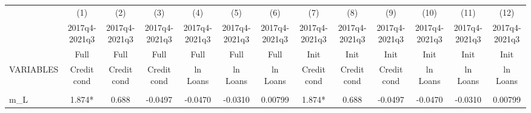 \documentclass[]{article}
\begin{document}
\begin{center}
\begin{tabular}{lcccccccccccc} \hline
 & (1) & (2) & (3) & (4) & (5) & (6) & (7) & (8) & (9) & (10) & (11) & (12) \\
 & 2017q4-2021q3 & 2017q4-2021q3 & 2017q4-2021q3 & 2017q4-2021q3 & 2017q4-2021q3 & 2017q4-2021q3 & 2017q4-2021q3 & 2017q4-2021q3 & 2017q4-2021q3 & 2017q4-2021q3 & 2017q4-2021q3 & 2017q4-2021q3 \\
 & Full & Full & Full & Full & Full & Full & Init & Init & Init & Init & Init & Init \\
VARIABLES & Credit cond & Credit cond & Credit cond & ln Loans & ln Loans & ln Loans & Credit cond & Credit cond & Credit cond & ln Loans & ln Loans & ln Loans \\ \hline
\vspace{4pt} & \begin{footnotesize}\end{footnotesize} & \begin{footnotesize}\end{footnotesize} & \begin{footnotesize}\end{footnotesize} & \begin{footnotesize}\end{footnotesize} & \begin{footnotesize}\end{footnotesize} & \begin{footnotesize}\end{footnotesize} & \begin{footnotesize}\end{footnotesize} & \begin{footnotesize}\end{footnotesize} & \begin{footnotesize}\end{footnotesize} & \begin{footnotesize}\end{footnotesize} & \begin{footnotesize}\end{footnotesize} & \begin{footnotesize}\end{footnotesize} \\
m\_L & 1.874* & 0.688 & -0.0497 & -0.0470 & -0.0310 & 0.00799 & 1.874* & 0.688 & -0.0497 & -0.0470 & -0.0310 & 0.00799 \\

\end{tabular}
\end{center}
\end{document}
